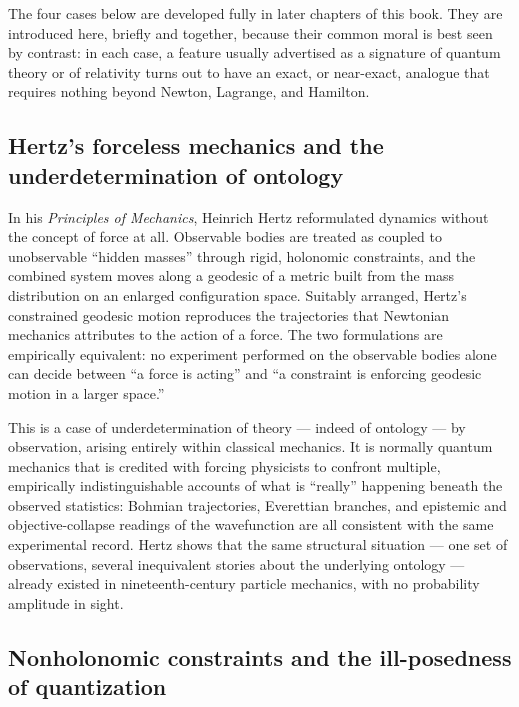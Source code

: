 The four cases below are developed fully in later chapters of this book. They
are introduced here, briefly and together, because their common moral is best
seen by contrast: in each case, a feature usually advertised as a signature of
quantum theory or of relativity turns out to have an exact, or near-exact,
analogue that requires nothing beyond Newton, Lagrange, and Hamilton.

\subsection{Hertz's forceless mechanics and the underdetermination of ontology}

In his \emph{Principles of Mechanics}, Heinrich Hertz reformulated dynamics
without the concept of force at all. Observable bodies are treated as coupled to
unobservable ``hidden masses'' through rigid, holonomic constraints, and the
combined system moves along a geodesic of a metric built from the mass
distribution on an enlarged configuration space. Suitably arranged, Hertz's
constrained geodesic motion reproduces the trajectories that Newtonian mechanics
attributes to the action of a force. The two formulations are empirically
equivalent: no experiment performed on the observable bodies alone can decide
between ``a force is acting'' and ``a constraint is enforcing geodesic motion in
a larger space.''

This is a case of underdetermination of theory --- indeed of ontology --- by
observation, arising entirely within classical mechanics. It is normally quantum
mechanics that is credited with forcing physicists to confront multiple,
empirically indistinguishable accounts of what is ``really'' happening beneath
the observed statistics: Bohmian trajectories, Everettian branches, and
epistemic and objective-collapse readings of the wavefunction are all consistent
with the same experimental record. Hertz shows that the same structural
situation --- one set of observations, several inequivalent stories about the
underlying ontology --- already existed in nineteenth-century particle mechanics,
with no probability amplitude in sight.

\subsection{Nonholonomic constraints and the ill-posedness of quantization}

